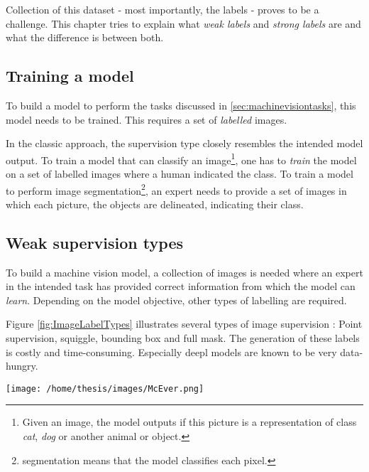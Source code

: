 Collection of this dataset - most importantly, the labels - proves to be a challenge. 
This chapter tries to explain what \textit{weak labels} and \textit{strong labels} are and what the difference is between both.

\subsection{Training a model}

To build a model to perform the tasks discussed in \ref{sec:machinevisiontasks}, this model needs to be trained.
This requires a set of \textit{labelled} images. 

In the classic approach, the supervision type closely resembles the intended model output.
To train a model that can classify an image\footnote{Given an image, the model outputs if this picture is a representation of class \textit{cat}, \textit{dog} or another animal or object. }, 
one has to \textit{train} the model on a set of labelled images where a human indicated the class.
To train a model to perform image segmentation\footnote{segmentation means that the model classifies each pixel.}, an expert needs to provide a set of images in which
each picture, the objects are delineated, indicating their class.  



\subsection{Weak supervision types}


To build a machine vision model, a collection of images is needed where an expert in the intended task has provided correct information from which the model can \textit{learn}.
Depending on the model objective, other types of labelling are required.


Figure \ref{fig:ImageLabelTypes} illustrates several types of image supervision : 
Point supervision, squiggle, bounding box and full mask.
The generation of these labels is costly and time-consuming.
Especially \gls{deepl} models are known to be very data-hungry. 

\begin{SCfigure}[][htb]
    \centering
    \texttt{[image: /home/thesis/images/McEver.png]}
    \caption{Four different annotation types \cite{McEver2020}: 
    On the top left the picture is point level annotated. The points are inflated for visibility.
    On the top right, squiggle annotation is used.
    The bottom left shows bounding box supervion.
    While the bottom right image is fully annotated.
    An image level label would indicate that there are multiple instances of \textit{person} and \textit{bike} in the image.
    \label{fig:ImageLabelTypes}}
\end{SCfigure}

